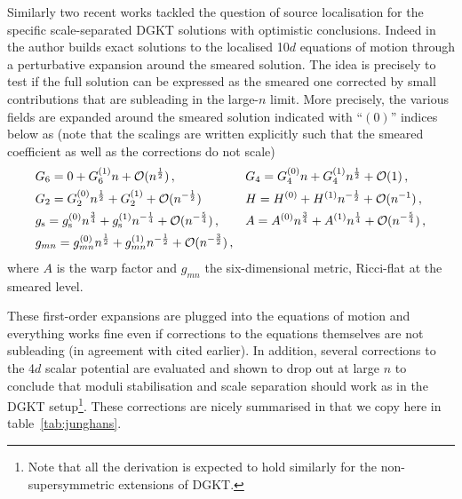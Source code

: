 \documentclass[11pt, a4paper]{article}
\newcommand{\half}{\frac{1}{2}}
\begin{document}
Similarly two recent works tackled the question of source localisation for the specific scale-separated DGKT solutions with optimistic conclusions. Indeed in \cite{Junghans:2020acz} the author builds exact solutions to the localised 10$d$ equations of motion through a perturbative expansion around the smeared solution. The idea is precisely to test if the full solution can be expressed as the smeared one corrected by small contributions that are subleading in the large-$n$ limit. More precisely, the various fields are expanded around the smeared solution indicated with ``$(0)$'' indices below as (note that the scalings are written explicitly such that the smeared coefficient as well as the corrections do not scale)
\begin{equation}
\begin{aligned}
&G_6=0+G_6^{(1)}n+\mathcal{O}(n^{\half})\, ,\quad &&G_4=G_4^{(0)}n+G_4^{(1)}n^\half+\mathcal{O}(1)\, ,\\ &G_2=G_2^{(0)}n^\half+G_2^{(1)}+\mathcal{O}(n^{-\half})\,\quad &&H=H^{(0)}+H^{(1)}n^{-\half}+\mathcal{O}(n^{-1})\, ,\\
&g_{\rm s}=g_{\rm s}^{(0)}n^{\frac{3}{4}}+g_{\rm s}^{(1)}n^{-\frac{1}{4}}+\mathcal{O}(n^{-\frac{5}{4}})\, ,\quad &&A=A^{(0)}n^{\frac{3}{4}}+A^{(1)}n^{\frac{1}{4}}+\mathcal{O}(n^{-\frac{5}{4}})\, ,\\
&g_{mn}=g_{mn}^{(0)}n^\half+g_{mn}^{(1)}n^{-\half}+\mathcal{O}(n^{-\frac{3}{2}})\, ,
\end{aligned}
\end{equation}
%
where $A$ is the warp factor and $g_{mn}$ the six-dimensional metric, Ricci-flat at the smeared level.

These first-order expansions are plugged into the equations of motion and everything works fine even if corrections to the equations themselves are not subleading (in agreement with \cite{Douglas:2010rt} cited earlier). In addition, several corrections to the 4$d$ scalar potential are evaluated and shown to drop out at large $n$ to conclude that moduli stabilisation and scale separation should work as in the DGKT setup\footnote{Note that all the derivation is expected to hold similarly for the non-supersymmetric extensions of DGKT.}. These corrections are nicely summarised in \cite[Table 3]{Junghans:2020acz} that we copy here in table~\ref{tab:junghans}.
\end{document}
